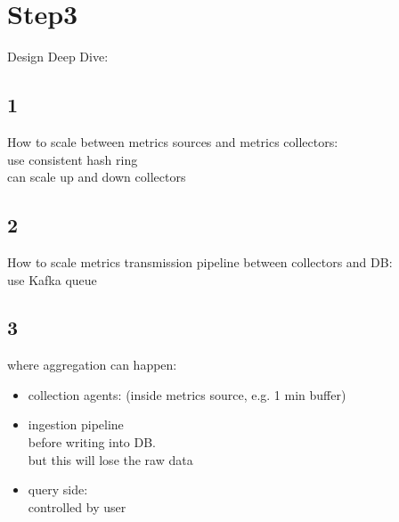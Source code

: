 \documentclass{article}
\begin{document}
\section{Step3}
Design Deep Dive:\\
\subsection{1}
How to scale between metrics sources and metrics collectors:\\
use consistent hash ring\\
can scale up and down collectors\\
\subsection{2}
How to scale metrics transmission pipeline between collectors and DB:\\
use Kafka queue
\subsection{3}
where aggregation can happen:\\
\begin{itemize}
    \item collection agents: (inside metrics source, e.g. 1 min buffer)
    \item ingestion pipeline\\
    before writing into DB.\\
    but this will lose the raw data\\
    \item query side:\\
    controlled by user
\end{itemize}
\end{document}
